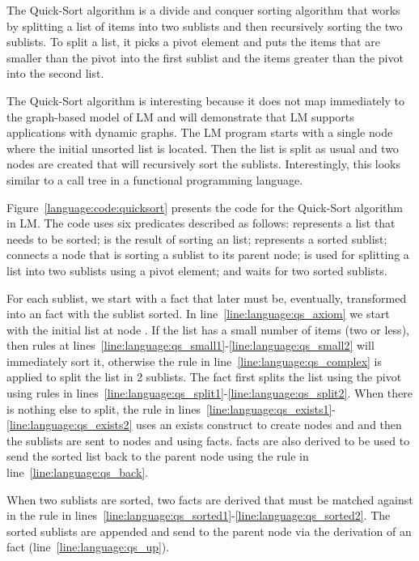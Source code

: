 The Quick-Sort algorithm is a divide and conquer sorting algorithm that works by
splitting a list of items into two sublists and then recursively sorting the two
sublists. To split a list, it picks a pivot element and puts the items that are
smaller than the pivot into the first sublist and the items greater than the pivot
into the second list.

The Quick-Sort algorithm is interesting because it does not map immediately to
the graph-based model of LM and will demonstrate that LM supports applications
with dynamic graphs. The LM program starts with a single node where the initial
unsorted list is located. Then the list is split as usual and two nodes are
created that will recursively sort the sublists. Interestingly, this looks
similar to a call tree in a functional programming language.

Figure~\ref{language:code:quicksort} presents the code for the Quick-Sort
algorithm in LM. The code uses six predicates described as follows: 
represents a list that needs to be sorted;  is the result of sorting
an  list;  represents a sorted sublist; 
connects a node that is sorting a sublist to its parent node;  is
used for splitting a list into two sublists using a pivot element; and
 waits for two sorted sublists.

For each sublist, we start with a  fact that later
must be, eventually, transformed into an  fact with the sublist sorted.
In line~\ref{line:language:qs_axiom} we start with the initial list at node
. If the list has a small number of items (two or less), then rules at
lines~\ref{line:language:qs_small1}-\ref{line:language:qs_small2} will
immediately sort it, otherwise the rule in line~\ref{line:language:qs_complex}
is applied to split the list in 2 sublists. The fact  first splits
the list using the pivot  using rules in
lines~\ref{line:language:qs_split1}-\ref{line:language:qs_split2}.  When there
is nothing else to split, the rule in
lines~\ref{line:language:qs_exists1}-\ref{line:language:qs_exists2} uses an
exists construct to create nodes  and  and then the sublists are
sent to nodes  and  using  facts.   facts
are also derived to be used to send the sorted list back to the parent node
using the rule in line~\ref{line:language:qs_back}.

When two sublists are sorted, two  facts are derived that must be
matched against  in the rule in
lines~\ref{line:language:qs_sorted1}-\ref{line:language:qs_sorted2}. The sorted
sublists are appended and send  to the parent node via the derivation
of an  fact (line~\ref{line:language:qs_up}).

